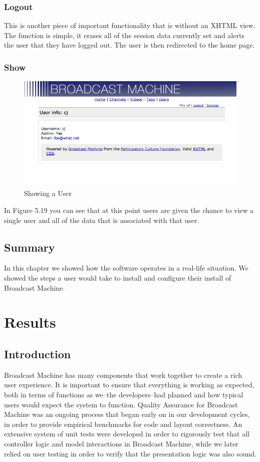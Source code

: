 \documentclass[a4paper,12pt]{report}
\begin{document}
\subsection{Logout}
This is another piece of important functionality that is without an XHTML view.
The function is simple, it erases all of the session data currently set and alerts the user that they have logged out.
The user is then redirected to the home page.

\subsection{Show}
\begin{figure}[htp]
\begin{center}
\includegraphics[width=150mm]{./images/usershow.png}
\end{center}
\caption{Showing a User}
\end{figure}
In Figure 5.19 you can see that at this point users are given the chance to view a single user and all of the data that is associated with that user.

\section{Summary}
In this chapter we showed how the software operates in a real-life situation. We showed the steps a user would take to install and 
configure their install of Broadcast Machine. 

\chapter{Results}

\section{Introduction}
Broadcast Machine has many components that work together to create a rich user experience. It is important to ensure that everything is 
working as expected, both in terms of functions as we--the developers--had planned and how typical users would expect the system to 
function.
Quality Assurance for Broadcast Machine was an ongoing process that began early on in our development cycles, in order to provide 
empirical benchmarks for code and layout correctness. 
An extensive system of unit tests were developed in order to rigorously test that all controller logic and model interactions in Broadcast Machine, while we later relied on user testing in order to verify that the presentation logic was also sound.
\end{document}
